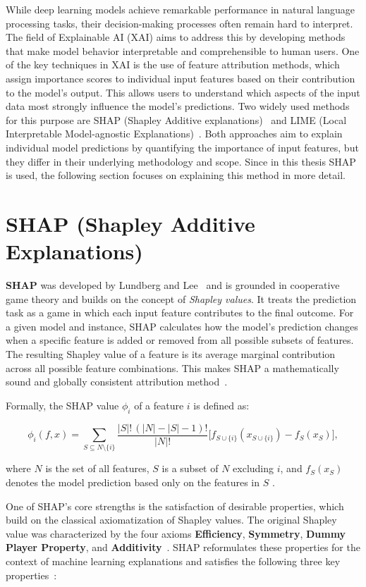 While deep learning models achieve remarkable performance in natural language processing tasks, their decision-making processes often remain hard to interpret. The field of Explainable AI (XAI) aims to address this by developing methods that make model behavior interpretable and comprehensible to human users.  One of the key techniques in XAI is the use of feature attribution methods, which assign importance scores to individual input features based on their contribution to the model's output. This allows users to understand which aspects of the input data most strongly influence the model's predictions. Two widely used methods for this purpose are SHAP (Shapley Additive explanations)~\cite{lundberg2017shap} and LIME (Local Interpretable Model-agnostic Explanations)~\cite{ribeiro2016lime}. Both approaches aim to explain individual model predictions by quantifying the importance of input features, but they differ in their underlying methodology and scope. Since in this thesis SHAP is used, the following section focuses on explaining this method in more detail. 


\section{SHAP (Shapley Additive Explanations)}
\textbf{SHAP} was developed by Lundberg and Lee~\cite{lundberg2017shap} and is grounded in cooperative game theory and builds on the concept of \emph{Shapley values}. It treats the prediction task as a game in which each input feature contributes to the final outcome. For a given model and instance, SHAP calculates how the model's prediction changes when a specific feature is added or removed from all possible subsets of features. The resulting Shapley value of a feature is its average marginal contribution across all possible feature combinations. This makes SHAP a mathematically sound and globally consistent attribution method~\cite{lundberg2017shap}.

Formally, the SHAP value $\phi_i$ of a feature $i$ is defined as:

\[
\phi_i(f, x) = 
\sum_{S \subseteq N \setminus \{i\}} 
\frac{|S|!\,(|N|-|S|-1)!}{|N|!} 
\Big[ f_{S \cup \{i\}}(x_{S \cup \{i\}}) - f_S(x_S) \Big],
\]

where $N$ is the set of all features, $S$ is a subset of $N$ excluding $i$, and 
$f_S(x_S)$ denotes the model prediction based only on the features in $S$ 
\cite{lundberg2017shap}.

One of SHAP's core strengths is the satisfaction of desirable properties, which build on the classical axiomatization of Shapley values. The original Shapley value was characterized by the four axioms \textbf{Efficiency}, \textbf{Symmetry}, \textbf{Dummy Player Property}, and \textbf{Additivity}~\cite{shapley1953value}. SHAP reformulates these properties for the context of machine learning explanations and satisfies the following three key properties~\cite{lundberg2017shap}:


